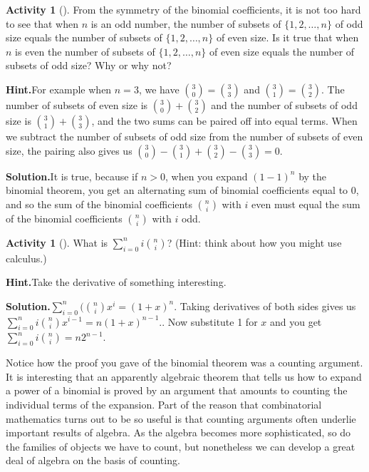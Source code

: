 \documentclass[10pt,]{book}
\theoremstyle{plain}
\theoremstyle{definition}
\newtheorem{activity}[project]{Activity}
\numberwithin{equation}{chapter}
\begin{document}
\begin{activity}[]\label{activity-58}
From the symmetry of the binomial coefficients, it is not too hard to see that when \(n\) is an odd number, the number of subsets of \(\{1,2,\ldots,n\}\) of odd size equals the number of subsets of \(\{1,2,\ldots,n\}\) of even size. Is it true that when \(n\) is even the number of subsets of \(\{1,2,\ldots,n\}\) of even size equals the number of subsets of odd size? Why or why not?%
\par\medskip\noindent%
\textbf{Hint.}\quad For example when \(n = 3\), we have \(\binom{3}{0} = \binom{3}{3}\) and \(\binom{3}{1} = \binom{3}{2}\).  The number of subsets of even size is \(\binom{3}{0}+\binom{3}{2}\) and the number of subsets of odd size is \(\binom{3}{1} + \binom{3}{3}\), and the two sums can be paired off into equal terms.  When we subtract the number of subsets of odd size from the number of subsets of even size, the pairing also gives us \(\binom{3}{0} - \binom{3}{1} + \binom{3}{2} - \binom{3}{3} =
0\).%
\par\medskip\noindent%
\textbf{Solution.}\quad It is true, because if \(n>0\), when you expand \((1-1)^n\) by the binomial theorem, you get an alternating sum of binomial coefficients equal to 0, and so the sum of the binomial coefficients \(\binom{n}{i}\) with \(i\) even must equal the sum of the binomial coefficients \(\binom{n}{i}\) with \(i\) odd.%
\end{activity}
\begin{activity}[]\label{activity-59}
What is \(\sum_{i=0}^n i\binom{n}{i}\)? (Hint: think about how you might use calculus.)%
\par\medskip\noindent%
\textbf{Hint.}\quad Take the derivative of something interesting.%
\par\medskip\noindent%
\textbf{Solution.}\quad \(\sum_{i=0}^n(\binom{n}{i}x^i = (1+x)^n\). Taking derivatives of both sides gives us \(\sum_{i=0}^ni\binom{n}{i}x^{i-1} = n(1+x)^{n-1}.\). Now substitute 1 for \(x\) and you get \(\sum_{i=0}^n i\binom{n}{i} = n2^{n-1}\).%
\end{activity}
Notice how the proof you gave of the binomial theorem was a counting argument. It is interesting that an apparently algebraic theorem that tells us how to expand a power of a binomial is proved by an argument that amounts to counting the individual terms of the expansion. Part of the reason that combinatorial mathematics turns out to be so useful is that counting arguments often underlie important results of algebra. As the algebra becomes more sophisticated, so do the families of objects we have to count, but nonetheless we can develop a great deal of algebra on the basis of counting.%
\typeout{************************************************}
\typeout{************************************************}
\end{document}
